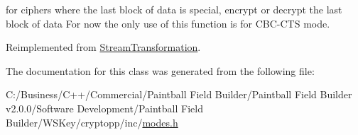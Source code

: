 for ciphers where the last block of data is special, encrypt or decrypt the last block of data For now the only use of this function is for CBC-\/CTS mode. 

Reimplemented from \hyperlink{class_stream_transformation_a31556c19e6e689cfc5c35ea3b3d32c36}{StreamTransformation}.

The documentation for this class was generated from the following file:\begin{DoxyCompactItemize}
\item 
C:/Business/C++/Commercial/Paintball Field Builder/Paintball Field Builder v2.0.0/Software Development/Paintball Field Builder/WSKey/cryptopp/inc/\hyperlink{modes_8h}{modes.h}\end{DoxyCompactItemize}
